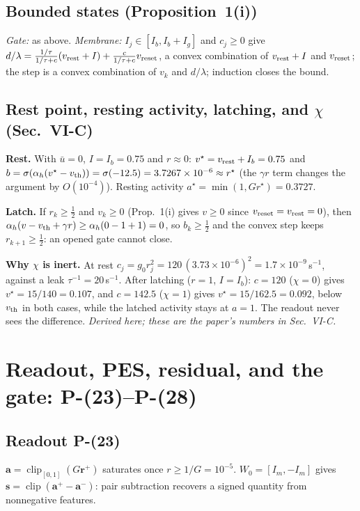 \documentclass[11pt]{article}
\newcommand{\srcroot}{../..}
\newcommand{\clip}{\operatorname{clip}}
\newcommand{\Peq}[1]{P-(#1)}
\theoremstyle{remark}
\newcommand{\listing}[4]{%
  \Needspace{8\baselineskip}%
  }
\begin{document}
\subsection{Bounded states (Proposition~1(i))}
\emph{Gate:} as above. \emph{Membrane:} $I_j\in[I_b,I_b+I_g]$ and $c_j\ge0$ give
$d/\lambda=\frac{1/\tau}{1/\tau+c}(v_{\rm rest}+I)+\frac{c}{1/\tau+c}v_{\rm reset}$, a convex combination of
$v_{\rm rest}+I$ and $v_{\rm reset}$; the step is a convex combination of $v_k$ and $d/\lambda$; induction closes the bound.

\subsection{\texorpdfstring{Rest point, resting activity, latching, and $\chi$ (Sec.~VI-C)}{Rest point, resting activity, latching, and chi (Sec. VI-C)}}
\textbf{Rest.} With $\bar u=0$, $I=I_b=0.75$ and $r\approx0$: $v^\star=v_{\rm rest}+I_b=0.75$ and
$b=\sigma(\alpha_h(v^\star-v_{\rm th}))=\sigma(-12.5)=3.7267\times10^{-6}\approx r^\star$ (the $\gamma r$ term changes the argument by
$O(10^{-4})$). Resting activity $a^\star=\min(1,Gr^\star)=0.3727$.

\textbf{Latch.} If $r_k\ge\frac12$ and $v_k\ge0$ (Prop.~1(i) gives $v\ge0$ since $v_{\rm reset}=v_{\rm rest}=0$), then
$\alpha_h(v-v_{\rm th}+\gamma r)\ge\alpha_h(0-1+1)=0$, so $b_k\ge\frac12$ and the convex step keeps $r_{k+1}\ge\frac12$:
an opened gate cannot close.

\textbf{Why $\chi$ is inert.} At rest $c_j=g_0r_j^2=120\,(3.73\times10^{-6})^2=1.7\times10^{-9}$\,s$^{-1}$, against a leak
$\tau^{-1}=20$\,s$^{-1}$. After latching ($r=1$, $I=I_b$): $c=120$ ($\chi=0$) gives $v^\star=15/140=0.107$, and $c=142.5$
($\chi=1$) gives $v^\star=15/162.5=0.092$, below $v_{\rm th}$ in both cases, while the latched activity stays at $a=1$.
The readout never sees the difference. \emph{Derived here; these are the paper's numbers in Sec.~VI-C.}

\section{Readout, PES, residual, and the gate: \Peq{23}--\Peq{28}}
\subsection{Readout \Peq{23}}
$\bm a=\clip_{[0,1]}(G\bm r^+)$ saturates once $r\ge1/G=10^{-5}$. $W_0=[I_m,-I_m]$ gives $\bm s=\clip(\bm a^+-\bm a^-)$: pair
subtraction recovers a signed quantity from nonnegative features.
\listing{experiments/nengo_nef_replication_2026-08-29/nengo_cmg.py}{143}{150}{$W_0=[I,-I]$ and the Nengo learning rate}
\end{document}
